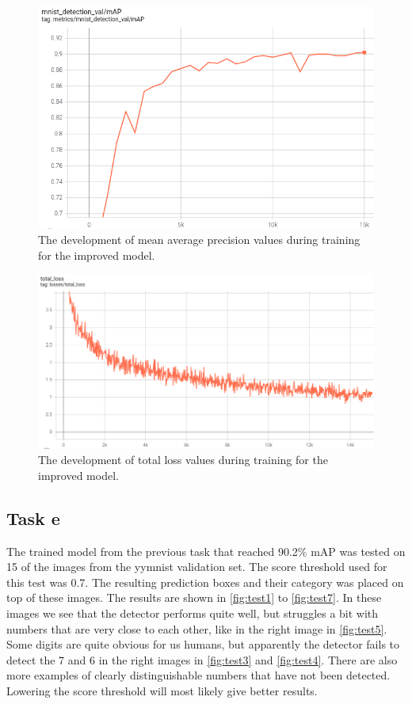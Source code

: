 \documentclass{article}
\begin{document}
\begin{figure}[H]
    \centering
    \includegraphics[width=\textwidth]{Assignments/Assignment_4/plots/mAp_hard.png}
    \caption{The development of mean average precision values during training for the improved model.}
    \label{fig:4dmap}
\end{figure}

\begin{figure}[H]
    \centering
    \includegraphics[width=\textwidth]{Assignments/Assignment_4/plots/tot_loss_hard.png}
    \caption{The development of total loss values during training for the improved model.}
    \label{fig:4dloss}
\end{figure}




\subsection{Task e}
The trained model from the previous task that reached 90.2\% mAP was tested on 15 of the images from the yymnist validation set. The score threshold used for this test was 0.7. The resulting prediction boxes and their category was placed on top of these images.
The results are shown in \autoref{fig:test1} to \autoref{fig:test7}. In these images we see that the detector performs quite well, but struggles a bit with numbers that are very close to each other, like in the right image in \autoref{fig:test5}. Some digits are quite obvious for us humans, but apparently the detector fails to detect the 7 and 6 in the right images in \autoref{fig:test3} and \autoref{fig:test4}. There are also more examples of clearly distinguishable numbers that have not been detected. Lowering the score threshold will most likely give better results.
\end{document}
